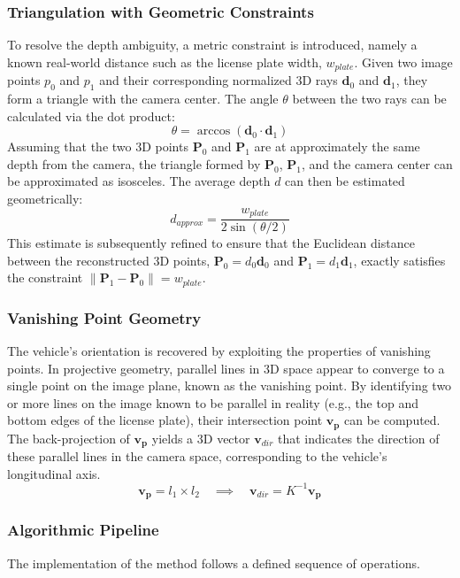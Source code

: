 \subsubsection{Triangulation with Geometric Constraints}
To resolve the depth ambiguity, a metric constraint is introduced, namely a known real-world distance such as the license plate width, $w_{plate}$. Given two image points $p_0$ and $p_1$ and their corresponding normalized 3D rays $\mathbf{d}_0$ and $\mathbf{d}_1$, they form a triangle with the camera center. The angle $\theta$ between the two rays can be calculated via the dot product:
\[
\theta = \arccos(\mathbf{d}_0 \cdot \mathbf{d}_1)
\]
Assuming that the two 3D points $\mathbf{P}_0$ and $\mathbf{P}_1$ are at approximately the same depth from the camera, the triangle formed by $\mathbf{P}_0$, $\mathbf{P}_1$, and the camera center can be approximated as isosceles. The average depth $d$ can then be estimated geometrically:
\[
d_{approx} = \frac{w_{plate}}{2 \sin(\theta / 2)}
\]
This estimate is subsequently refined to ensure that the Euclidean distance between the reconstructed 3D points, $\mathbf{P}_0 = d_0 \mathbf{d}_0$ and $\mathbf{P}_1 = d_1 \mathbf{d}_1$, exactly satisfies the constraint $\|\mathbf{P}_1 - \mathbf{P}_0\| = w_{plate}$.

\subsubsection{Vanishing Point Geometry}
The vehicle's orientation is recovered by exploiting the properties of vanishing points. In projective geometry, parallel lines in 3D space appear to converge to a single point on the image plane, known as the vanishing point. By identifying two or more lines on the image known to be parallel in reality (e.g., the top and bottom edges of the license plate), their intersection point $\mathbf{v_p}$ can be computed. The back-projection of $\mathbf{v_p}$ yields a 3D vector $\mathbf{v}_{dir}$ that indicates the direction of these parallel lines in the camera space, corresponding to the vehicle's longitudinal axis.
\[
\mathbf{v_p} = l_1 \times l_2 \quad \implies \quad \mathbf{v}_{dir} = K^{-1} \mathbf{v_p}
\]

\subsubsection{Algorithmic Pipeline}
The implementation of the method follows a defined sequence of operations.


